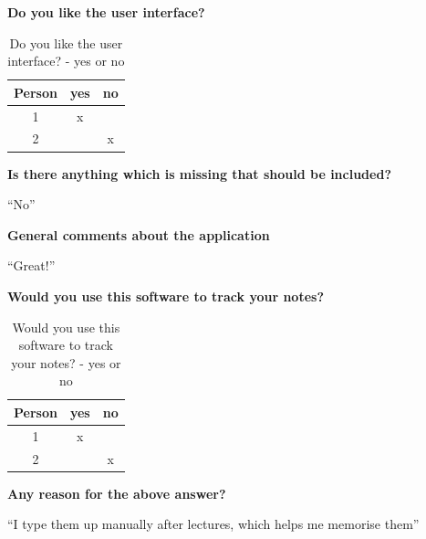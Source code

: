 \noindent
\textbf{Do you like the user interface?}
\begin{table}[h!]
\centering
 \begin{tabular}{|c c c|}
 \hline
   Person & yes & no \\ [0.5ex]
 \hline\hline
    1 & x &  \\
    2 & & x  \\
 \hline
  \end{tabular}
  \caption{Do you like the user interface? - yes or no}
\end{table}

\noindent
\textbf{Is there anything which is missing that should be included?}

``No''

\noindent
\textbf{General comments about the application}

``Great!''

\noindent
\textbf{Would you use this software to track your notes?}
\begin{table}[h!]
\centering
 \begin{tabular}{|c c c|}
 \hline
   Person & yes & no \\ [0.5ex]
 \hline\hline
    1 & x &  \\
    2 & & x  \\
 \hline
  \end{tabular}
  \caption{Would you use this software to track your notes? - yes or no}
\end{table}

\noindent
\textbf{Any reason for the above answer?}

``I type them up manually after lectures, which helps me memorise them''
